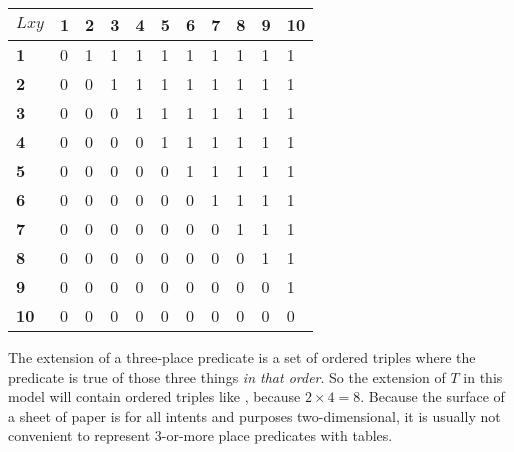 \begin{table}[h!]
\centering
\begin{tabular}{l|llllllllll}
$Lxy$         & \textbf{1} & \textbf{2} & \textbf{3} & \textbf{4} & \textbf{5} & \textbf{6} & \textbf{7} & \textbf{8} & \textbf{9} & \textbf{10} \\ \hline
\textbf{1}  & 0          & 1          & 1          & 1          & 1          & 1          & 1          & 1          & 1          & 1           \\
\textbf{2}  & 0          & 0          & 1          & 1          & 1          & 1          & 1          & 1          & 1          & 1           \\
\textbf{3}  & 0          & 0          & 0          & 1          & 1          & 1          & 1          & 1          & 1          & 1           \\
\textbf{4}  & 0          & 0          & 0          & 0          & 1          & 1          & 1          & 1          & 1          & 1           \\
\textbf{5}  & 0          & 0          & 0          & 0          & 0          & 1          & 1          & 1          & 1          & 1           \\
\textbf{6}  & 0          & 0          & 0          & 0          & 0          & 0          & 1          & 1          & 1          & 1           \\
\textbf{7}  & 0          & 0          & 0          & 0          & 0          & 0          & 0          & 1          & 1          & 1           \\
\textbf{8}  & 0          & 0          & 0          & 0          & 0          & 0          & 0          & 0          & 1          & 1           \\
\textbf{9}  & 0          & 0          & 0          & 0          & 0          & 0          & 0          & 0          & 0          & 1           \\
\textbf{10} & 0          & 0          & 0          & 0          & 0          & 0          & 0          & 0          & 0          & 0          
\end{tabular}
\end{table}


The extension of a three-place predicate is a set of ordered triples where the predicate is true of those three things \emph{in that order}. So the extension of $T$ in this model will contain ordered triples like , because $2\times 4 = 8$. Because the surface of a sheet of paper is for all intents and purposes two-dimensional, it is usually not convenient to represent 3-or-more place predicates with tables.

